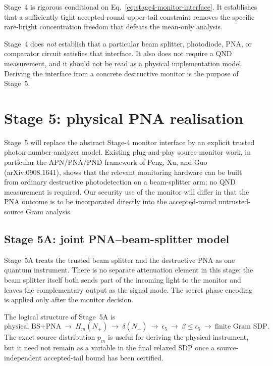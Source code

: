\documentclass[11pt]{article}
\theoremstyle{remark}
\begin{document}
Stage~4 is rigorous conditional on
Eq.~\eqref{eq:stage4-monitor-interface}.  It establishes that a sufficiently
tight accepted-round upper-tail constraint removes the specific rare-bright
concentration freedom that defeats the mean-only analysis.

Stage~4 does \emph{not} establish that a particular beam splitter,
photodiode, PNA, or comparator circuit satisfies that interface.  It also does
not require a QND measurement, and it should not be read as a physical
implementation model.  Deriving the interface from a concrete destructive
monitor is the purpose of Stage~5.

\section{Stage 5: physical PNA realisation}
\label{sec:stage5-plan}

Stage~5 will replace the abstract Stage-4 monitor interface by an explicit
trusted photon-number-analyzer model.  Existing plug-and-play source-monitor
work, in particular the APN/PNA/PND framework of Peng, Xu, and Guo
(arXiv:0908.1641), shows that the relevant monitoring hardware can be built
from ordinary destructive photodetection on a beam-splitter arm; no QND
measurement is required.  Our security use of the monitor will differ in that
the PNA outcome is to be incorporated directly into the accepted-round
untrusted-source Gram analysis.

\subsection{Stage 5A: joint PNA--beam-splitter model}
\label{sec:stage5a}

Stage~5A treats the trusted beam splitter and the destructive PNA as one
quantum instrument.  There is no separate attenuation element in this stage:
the beam splitter itself both sends part of the incoming light to the monitor
and leaves the complementary output as the signal mode.  The secret phase
encoding is applied only after the monitor decision.

The logical structure of Stage~5A is
\begin{equation}
\boxed{
\text{physical BS+PNA}
\ \longrightarrow\
H_m(N_+)
\ \longrightarrow\
\delta(N_+)
\ \longrightarrow\
\epsilon_5
\ \longrightarrow\
\beta\le\epsilon_5
\ \longrightarrow\
\text{finite Gram SDP}.
}
\label{eq:stage5a-roadmap}
\end{equation}
The exact source distribution \(p_m\) is useful for deriving the physical
instrument, but it need not remain as a variable in the final relaxed SDP once
a source-independent accepted-tail bound has been certified.
\end{document}
